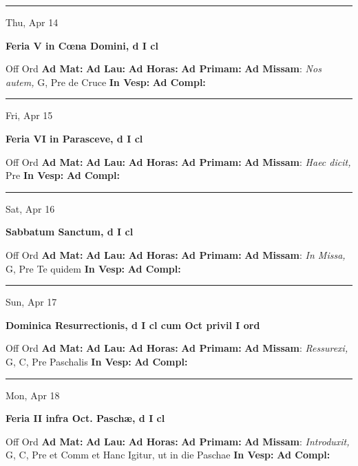 \documentclass[letterpaper, 10pt]{article}
\begin{document}
\hrule
\begin{center}
Thu, Apr 14
\end{center}\textbf{ \large Feria V in Cœna Domini, \textnormal{\normalsize d I cl}}
\begin{justify}
Off Ord
\textbf{Ad Mat: }
\textbf{Ad Lau: }
\textbf{Ad Horas: }
\textbf{Ad Primam: }
\textbf{Ad Missam}: \textit{Nos autem,} G, Pre de Cruce
\textbf{In Vesp: }
\textbf{Ad Compl: }\end{justify}



\hrule
\begin{center}
Fri, Apr 15
\end{center}\textbf{ \large Feria VI in Parasceve, \textnormal{\normalsize d I cl}}
\begin{justify}
Off Ord
\textbf{Ad Mat: }
\textbf{Ad Lau: }
\textbf{Ad Horas: }
\textbf{Ad Primam: }
\textbf{Ad Missam}: \textit{Haec dicit,} Pre 
\textbf{In Vesp: }
\textbf{Ad Compl: }\end{justify}



\hrule
\begin{center}
Sat, Apr 16
\end{center}\textbf{ \large Sabbatum Sanctum, \textnormal{\normalsize d I cl}}
\begin{justify}
Off Ord
\textbf{Ad Mat: }
\textbf{Ad Lau: }
\textbf{Ad Horas: }
\textbf{Ad Primam: }
\textbf{Ad Missam}: \textit{In Missa,} G, Pre Te quidem
\textbf{In Vesp: }
\textbf{Ad Compl: }\end{justify}



\hrule
\begin{center}
Sun, Apr 17
\end{center}\textbf{ \large Dominica Resurrectionis, \textnormal{\normalsize d I cl cum Oct privil I ord}}
\begin{justify}
Off Ord
\textbf{Ad Mat: }
\textbf{Ad Lau: }
\textbf{Ad Horas: }
\textbf{Ad Primam: }
\textbf{Ad Missam}: \textit{Ressurexi,} G, C, Pre Paschalis
\textbf{In Vesp: }
\textbf{Ad Compl: }\end{justify}



\hrule
\begin{center}
Mon, Apr 18
\end{center}\textbf{ \large Feria II infra Oct. Paschæ, \textnormal{\normalsize d I cl}}
\begin{justify}
Off Ord
\textbf{Ad Mat: }
\textbf{Ad Lau: }
\textbf{Ad Horas: }
\textbf{Ad Primam: }
\textbf{Ad Missam}: \textit{Introduxit,} G, C, Pre et Comm et Hanc Igitur, ut in die Paschae
\textbf{In Vesp: }
\textbf{Ad Compl: }\end{justify}
\end{document}
